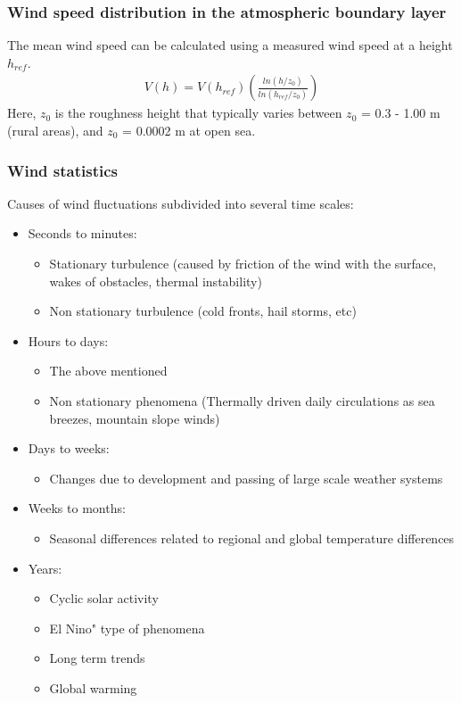 \documentclass[a4paper,10pt]{article}
\begin{document}
\subsubsection{Wind speed distribution in the atmospheric boundary layer}
The mean wind speed can be calculated using a measured wind speed at a height $h_{ref}$.
\begin{align}
V(h) = V(h_{ref}) \left( \frac{ln(h/z_0)}{ln (h_{ref}/z_0)}\right)
\end{align}
Here, $z_0$ is the roughness height that typically varies between $z_0$ = 0.3 - 1.00 m (rural areas), and $z_0$ = 0.0002 m at open sea.

\subsubsection{Wind statistics}
Causes of wind fluctuations subdivided into several time scales:
\begin{itemize}
 \item Seconds to minutes:
 \begin{itemize}
 \item Stationary turbulence (caused by friction of the wind with the surface, wakes of obstacles, thermal instability)
 \item Non stationary turbulence (cold fronts, hail storms, etc)
 \end{itemize}
 \item Hours to days:
 \begin{itemize}
 \item The above mentioned
 \item Non stationary phenomena (Thermally driven daily circulations as sea breezes, mountain slope winds)
 \end{itemize}
 \item Days to weeks:
 \begin{itemize}
  \item Changes due to development and passing of large scale weather systems
 \end{itemize}
 \item Weeks to months:
 \begin{itemize}
  \item Seasonal differences related to regional and global temperature differences
 \end{itemize}
 \item Years:
 \begin{itemize}
  \item Cyclic solar activity
  \item El Nino" type of phenomena
  \item Long term trends
  \item Global warming
 \end{itemize}
\end{itemize}
\end{document}
